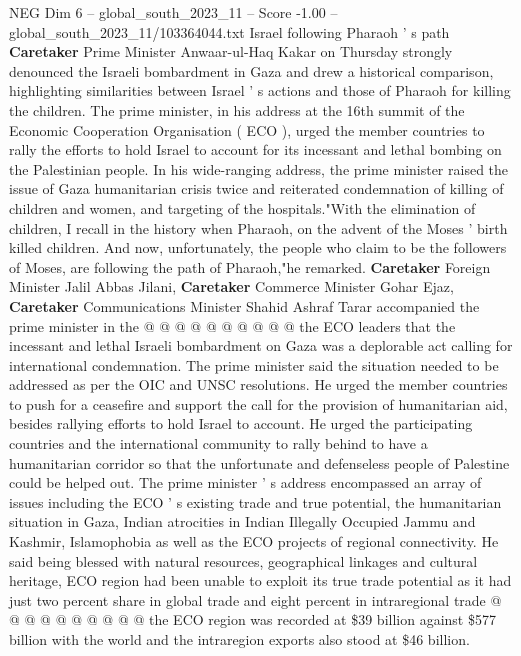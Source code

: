 \begin{textsample}{NEG Dim 6 – global\_south\_2023\_11 – Score -1.00 – global\_south\_2023\_11/103364044.txt}  \label{ex:f6_neg_154}
Israel following Pharaoh ' s path \textbf{Caretaker} Prime Minister Anwaar-ul-Haq Kakar on Thursday strongly denounced the Israeli bombardment in Gaza and drew a historical comparison, highlighting similarities between Israel ' s actions and those of Pharaoh for killing the children.
The prime minister, in his address at the 16th summit of the Economic Cooperation Organisation ( ECO ), urged the member countries to rally the efforts to hold Israel to account for its incessant and lethal bombing on the Palestinian people.
In his wide-ranging address, the prime minister raised the issue of Gaza humanitarian crisis twice and reiterated condemnation of killing of children and women, and targeting of the hospitals."With the elimination of children, I recall in the history when Pharaoh, on the advent of the Moses ' birth killed children.
And now, unfortunately, the people who claim to be the followers of Moses, are following the path of Pharaoh,"he remarked. \textbf{Caretaker} Foreign Minister Jalil Abbas Jilani, \textbf{Caretaker} Commerce Minister Gohar Ejaz, \textbf{Caretaker} Communications Minister Shahid Ashraf Tarar accompanied the prime minister in the @ @ @ @ @ @ @ @ @ @ the ECO leaders that the incessant and lethal Israeli bombardment on Gaza was a deplorable act calling for international condemnation.
The prime minister said the situation needed to be addressed as per the OIC and UNSC resolutions.
He urged the member countries to push for a ceasefire and support the call for the provision of humanitarian aid, besides rallying efforts to hold Israel to account.
He urged the participating countries and the international community to rally behind to have a humanitarian corridor so that the unfortunate and defenseless people of Palestine could be helped out.
The prime minister ' s address encompassed an array of issues including the ECO ' s existing trade and true potential, the humanitarian situation in Gaza, Indian atrocities in Indian Illegally Occupied Jammu and Kashmir, Islamophobia as well as the ECO projects of regional connectivity.
He said being blessed with natural resources, geographical linkages and cultural heritage, ECO region had been unable to exploit its true trade potential as it had just two percent share in global trade and eight percent in intraregional trade @ @ @ @ @ @ @ @ @ @ the ECO region was recorded at \$39 billion against \$577 billion with the world and the intraregion exports also stood at \$46 billion.

\end{textsample}
